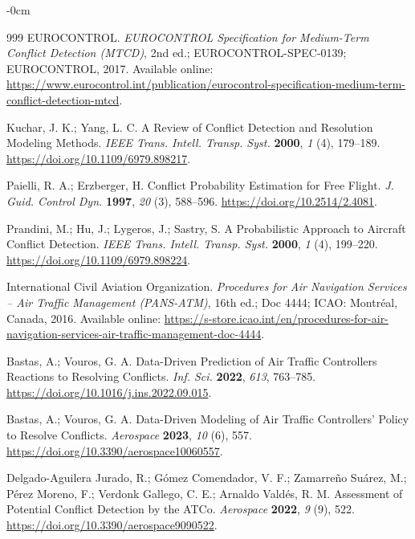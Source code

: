 \documentclass[aerospace,article,submit,moreauthors]{Definitions/mdpi}
\begin{document}
\begin{adjustwidth}{-\extralength}{0cm}
\begin{thebibliography}{999}
EUROCONTROL.
\textit{EUROCONTROL Specification for Medium-Term Conflict Detection (MTCD)},
2nd ed.; EUROCONTROL-SPEC-0139; EUROCONTROL, 2017.
Available online:
\url{https://www.eurocontrol.int/publication/eurocontrol-specification-medium-term-conflict-detection-mtcd}.

Kuchar, J. K.; Yang, L. C.
A Review of Conflict Detection and Resolution Modeling Methods.
{\em IEEE Trans. Intell. Transp. Syst.}
{\bf 2000}, {\em 1} (4), 179--189.
\url{https://doi.org/10.1109/6979.898217}.

Paielli, R. A.; Erzberger, H.
Conflict Probability Estimation for Free Flight.
{\em J. Guid. Control Dyn.}
{\bf 1997}, {\em 20} (3), 588--596.
\url{https://doi.org/10.2514/2.4081}.

Prandini, M.; Hu, J.; Lygeros, J.; Sastry, S.
A Probabilistic Approach to Aircraft Conflict Detection.
{\em IEEE Trans. Intell. Transp. Syst.}
{\bf 2000}, {\em 1} (4), 199--220.
\url{https://doi.org/10.1109/6979.898224}.

International Civil Aviation Organization.
\textit{Procedures for Air Navigation Services --
Air Traffic Management (PANS-ATM)},
16th ed.; Doc 4444;
ICAO: Montr\'eal, Canada, 2016.
Available online:
\url{https://s-store.icao.int/en/procedures-for-air-navigation-services-air-traffic-management-doc-4444}.

Bastas, A.; Vouros, G. A.
Data-Driven Prediction of Air Traffic Controllers
Reactions to Resolving Conflicts.
{\em Inf. Sci.}
{\bf 2022}, {\em 613}, 763--785.
\url{https://doi.org/10.1016/j.ins.2022.09.015}.

Bastas, A.; Vouros, G. A.
Data-Driven Modeling of Air Traffic Controllers'
Policy to Resolve Conflicts.
{\em Aerospace}
{\bf 2023}, {\em 10} (6), 557.
\url{https://doi.org/10.3390/aerospace10060557}.

Delgado-Aguilera Jurado, R.;
G\'omez Comendador, V. F.;
Zamarre\~no Su\'arez, M.;
P\'erez Moreno, F.;
Verdonk Gallego, C. E.;
Arnaldo Vald\'es, R. M.
Assessment of Potential Conflict Detection by the ATCo.
{\em Aerospace}
{\bf 2022}, {\em 9} (9), 522.
\url{https://doi.org/10.3390/aerospace9090522}.


\end{thebibliography}
\end{adjustwidth}
\end{document}
